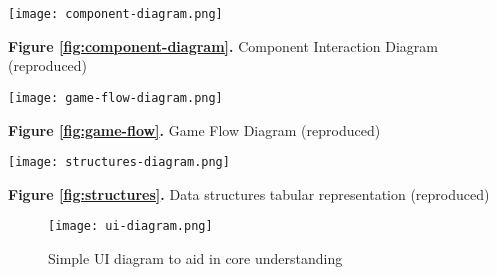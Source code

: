 \documentclass[11pt]{article}
\begin{document}
\bigskip

\begin{center}
\texttt{[image: component-diagram.png]}

\textbf{Figure \ref{fig:component-diagram}.} Component Interaction Diagram (reproduced)
\end{center}

\bigskip

\begin{center}
\texttt{[image: game-flow-diagram.png]}

\textbf{Figure \ref{fig:game-flow}.} Game Flow Diagram (reproduced)
\end{center}

\bigskip

\begin{center}
\texttt{[image: structures-diagram.png]}

\textbf{Figure \ref{fig:structures}.} Data structures tabular representation (reproduced)
\end{center}

\begin{figure}[ht]
\centering
\texttt{[image: ui-diagram.png]}
\caption{Simple UI diagram to aid in core understanding}
\label{fig:ui-diagram}
\end{figure}
\end{document}
